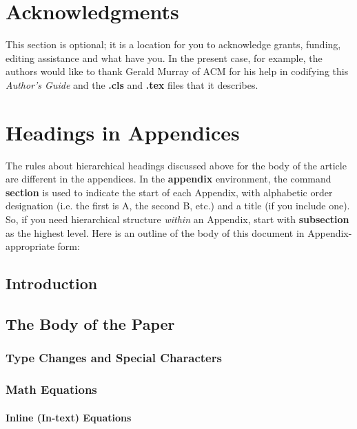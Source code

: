 \documentclass{sig-alternate2-pods09}
\begin{document}
\section{Acknowledgments}
This section is optional; it is a location for you
to acknowledge grants, funding, editing assistance and
what have you.  In the present case, for example, the
authors would like to thank Gerald Murray of ACM for
his help in codifying this \textit{Author's Guide}
and the \textbf{.cls} and \textbf{.tex} files that it describes.

%

%
%
\appendix
\section{Headings in Appendices}
The rules about hierarchical headings discussed above for
the body of the article are different in the appendices.
In the \textbf{appendix} environment, the command
\textbf{section} is used to
indicate the start of each Appendix, with alphabetic order
designation (i.e. the first is A, the second B, etc.) and
a title (if you include one).  So, if you need
hierarchical structure
\textit{within} an Appendix, start with \textbf{subsection} as the
highest level. Here is an outline of the body of this
document in Appendix-appropriate form:
\subsection{Introduction}
\subsection{The Body of the Paper}
\subsubsection{Type Changes and  Special Characters}
\subsubsection{Math Equations}
\paragraph{Inline (In-text) Equations}
\end{document}
